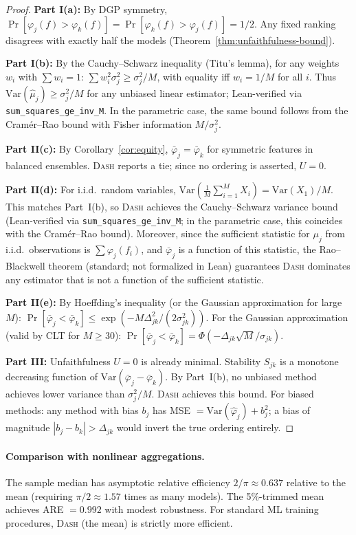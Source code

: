 \documentclass{jmlr}
\newcommand{\Var}{\mathrm{Var}}
\newcommand{\DASH}{\textsc{Dash}}
\begin{document}
\begin{proof}
\textbf{Part I(a):} By DGP symmetry, $\Pr[\varphi_j(f) > \varphi_k(f)] = \Pr[\varphi_k(f) > \varphi_j(f)] = 1/2$. Any fixed ranking disagrees with exactly half the models (Theorem~\ref{thm:unfaithfulness-bound}).

\textbf{Part I(b):} By the Cauchy--Schwarz inequality (Titu's lemma), for any weights $w_i$ with $\sum w_i = 1$: $\sum w_i^2 \sigma_j^2 \geq \sigma_j^2/M$, with equality iff $w_i = 1/M$ for all $i$. Thus $\Var(\hat\mu_j) \geq \sigma_j^2/M$ for any unbiased linear estimator; Lean-verified via \texttt{sum\_squares\_ge\_inv\_M}. In the parametric case, the same bound follows from the Cram\'er--Rao bound with Fisher information $M/\sigma_j^2$.

\textbf{Part II(c):} By Corollary~\ref{cor:equity}, $\bar\varphi_j = \bar\varphi_k$ for symmetric features in balanced ensembles. \DASH{} reports a tie; since no ordering is asserted, $U = 0$.

\textbf{Part II(d):} For i.i.d.\ random variables, $\Var(\frac{1}{M}\sum_{i=1}^M X_i) = \Var(X_1)/M$. This matches Part~I(b), so \DASH{} achieves the Cauchy--Schwarz variance bound (Lean-verified via \texttt{sum\_squares\_ge\_inv\_M}; in the parametric case, this coincides with the Cram\'er--Rao bound). Moreover, since the sufficient statistic for $\mu_j$ from i.i.d.\ observations is $\sum \varphi_j(f_i)$, and $\bar\varphi_j$ is a function of this statistic, the Rao--Blackwell theorem (standard; not formalized in Lean) guarantees \DASH{} dominates any estimator that is not a function of the sufficient statistic.

\textbf{Part II(e):} By Hoeffding's inequality (or the Gaussian approximation for large $M$): $\Pr[\bar\varphi_j < \bar\varphi_k] \leq \exp(-M\Delta_{jk}^2/(2\sigma_{jk}^2))$. For the Gaussian approximation (valid by CLT for $M \geq 30$): $\Pr[\bar\varphi_j < \bar\varphi_k] = \Phi(-\Delta_{jk}\sqrt{M}/\sigma_{jk})$.

\textbf{Part III:} Unfaithfulness $U = 0$ is already minimal. Stability $S_{jk}$ is a monotone decreasing function of $\Var(\bar\varphi_j - \bar\varphi_k)$. By Part~I(b), no unbiased method achieves lower variance than $\sigma_j^2/M$. \DASH{} achieves this bound. For biased methods: any method with bias $b_j$ has MSE $= \Var(\hat\varphi_j) + b_j^2$; a bias of magnitude $|b_j - b_k| > \Delta_{jk}$ would invert the true ordering entirely.
\end{proof}

\paragraph{Comparison with nonlinear aggregations.}
The sample median has asymptotic relative efficiency $2/\pi \approx 0.637$ relative to the mean (requiring $\pi/2 \approx 1.57$ times as many models). The 5\%-trimmed mean achieves ARE $= 0.992$ with modest robustness. For standard ML training procedures, \DASH{} (the mean) is strictly more efficient.
\end{document}
